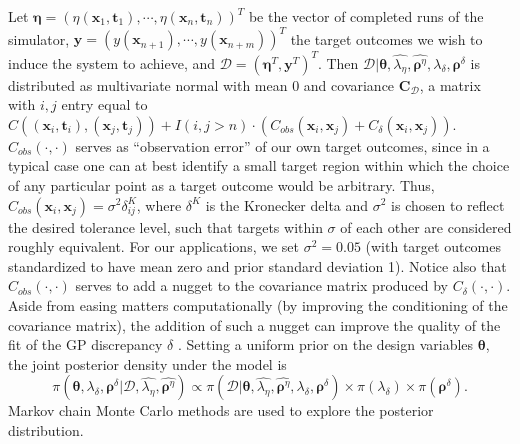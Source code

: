 \documentclass[12pt]{article}
\begin{document}
Let $\boldsymbol \eta = (\eta(\mathbf x_1,\mathbf t_1),\cdots,\eta(\mathbf x_n,\mathbf t_n))^T$ be the vector of completed runs of the simulator, $\mathbf y = (y(\mathbf x_{n+1}),\cdots,y(\mathbf x_{n+m}))^T$ the target outcomes we wish to induce the system to achieve, 
and $\mathcal D = (\boldsymbol \eta^T,\mathbf y^T)^T$.
%
Then $\mathcal D | \boldsymbol \theta,\widehat{\lambda_\eta}, \widehat{\boldsymbol \rho^\eta},\lambda_\delta,\boldsymbol \rho^\delta$ is distributed as multivariate normal with mean 0 and covariance $\mathbf C_\mathcal D$, a matrix with $i,j$ entry equal to 
$
C((\mathbf x_i,\mathbf t_i),(\mathbf x_j,\mathbf t_j)) + I(i,j>n)\cdot(C_{obs}(\mathbf x_i,\mathbf x_j) + C_\delta(\mathbf x_i,\mathbf x_j)).
$
%
$C_{obs}(\cdot,\cdot)$ serves as ``observation error'' of our own target outcomes, since in a typical case one can at best identify a small target region within which the choice of any particular point as a target outcome would be arbitrary.
%
Thus, $C_{obs}(\mathbf x_i,\mathbf x_j) = \sigma^2\delta^K_{ij}$, where $\delta^K$ is the Kronecker delta and $\sigma^2$ is chosen to reflect the desired tolerance level, such that targets within $\sigma$ of each other are considered roughly equivalent.
%
%
For our applications, we set $\sigma^2=0.05$ (with target outcomes standardized to have mean zero and prior standard deviation 1).
%
Notice also that $C_{obs}(\cdot,\cdot)$ serves to add a nugget to the covariance matrix produced by $C_\delta(\cdot,\cdot)$.
%
Aside from easing matters computationally (by improving the conditioning of the covariance matrix), the addition of such a nugget can improve the quality of the fit of the GP discrepancy $\delta$ \citep{Gramacy2012}.
%
Setting a uniform prior on the design variables $\boldsymbol\theta$, the joint posterior density under the model is
%
\begin{equation} \label{eq:full_dist}
\pi(\boldsymbol \theta,\lambda_\delta,\boldsymbol \rho^\delta|\mathcal D,\widehat{\lambda_\eta},\widehat{\boldsymbol \rho^\eta})
\propto \pi(\mathcal D | \boldsymbol \theta,\widehat{\lambda_\eta}, \widehat{\boldsymbol \rho^\eta},\lambda_\delta,\boldsymbol \rho^\delta) \times %
\pi(\lambda_\delta) \times \pi(\boldsymbol \rho^\delta).
\end{equation}
%
Markov chain Monte Carlo methods are used to explore the posterior distribution.
\end{document}
